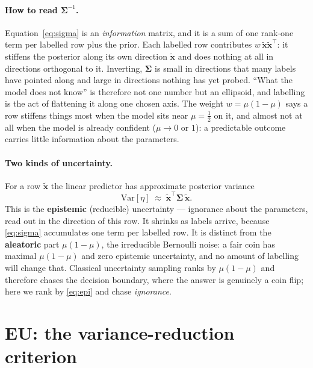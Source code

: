 \documentclass[11pt]{article}
\newcommand{\bx}{\bm{x}}
\newcommand{\bS}{\bm{\Sigma}}
\newcommand{\Var}{\mathrm{Var}}
\begin{document}
\paragraph{How to read $\bS^{-1}$.} Equation~\eqref{eq:sigma} is an \emph{information} matrix,
and it is a sum of one rank-one term per labelled row plus the prior. Each labelled row
contributes $w\,\tilde{\bx}\tilde{\bx}^{\!\top}$: it stiffens the posterior along its own
direction $\tilde{\bx}$ and does nothing at all in directions orthogonal to it. Inverting,
$\bS$ is small in directions that many labels have pointed along and large in directions nothing
has yet probed. ``What the model does not know'' is therefore not one number but an ellipsoid,
and labelling is the act of flattening it along one chosen axis. The weight
$w = \mu(1-\mu)$ says a row stiffens things most when the model sits near $\mu=\tfrac12$ on it,
and almost not at all when the model is already confident ($\mu\!\to\!0$ or $1$): a predictable
outcome carries little information about the parameters.

\paragraph{Two kinds of uncertainty.} For a row $\tilde{\bx}$ the linear predictor has
approximate posterior variance
\begin{equation}
  \Var[\eta] \;\approx\; \tilde{\bx}^{\!\top}\bS\,\tilde{\bx} .
  \label{eq:epi}
\end{equation}
This is the \textbf{epistemic} (reducible) uncertainty --- ignorance about the parameters, read
out in the direction of this row. It shrinks as labels arrive, because \eqref{eq:sigma}
accumulates one term per labelled row. It is distinct from the \textbf{aleatoric} part
$\mu(1-\mu)$, the irreducible Bernoulli noise: a fair coin has maximal $\mu(1-\mu)$ and zero
epistemic uncertainty, and no amount of labelling will change that. Classical uncertainty
sampling ranks by $\mu(1-\mu)$ and therefore chases the decision boundary, where the answer is
genuinely a coin flip; here we rank by \eqref{eq:epi} and chase \emph{ignorance}.

\section{EU: the variance-reduction criterion}
\label{sec:crit}
\end{document}
